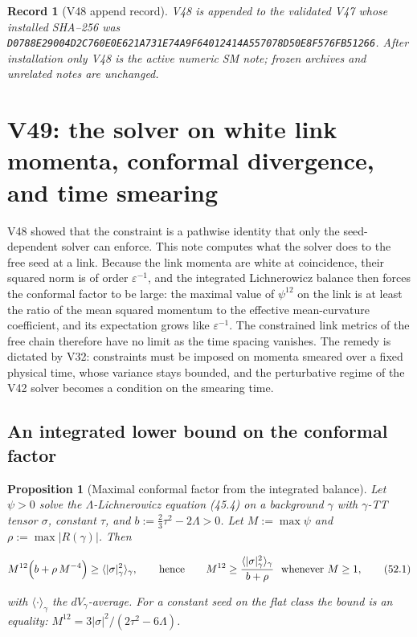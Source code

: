 \documentclass[11pt]{article}
\newtheorem{proposition}[theorem]{Proposition}
\newtheorem{record}[theorem]{Record}
\theoremstyle{remark}
\begin{document}
\begin{record}[V48 append record]
\label{rec:v19v48}
V48 is appended to the validated V47 whose installed SHA--256 was
\texttt{D0788E29004D2C760E0E621A731E74A9F64012414A557078D50E8F576FB51266}.
After installation only V48 is the active numeric SM note; frozen
archives and unrelated notes are unchanged.
\end{record}


\section{V49: the solver on white link momenta, conformal divergence, and time smearing}
\label{sec:v19v49}

V48 showed that the constraint is a pathwise identity that only the
seed-dependent solver can enforce.  This note computes what the solver
does to the free seed at a link.  Because the link momenta are white at
coincidence, their squared norm is of order \(\varepsilon^{-1}\), and the
integrated Lichnerowicz balance then forces the conformal factor to be
large: the maximal value of \(\psi^{12}\) on the link is at least the
ratio of the mean squared momentum to the effective mean-curvature
coefficient, and its expectation grows like \(\varepsilon^{-1}\).  The
constrained link metrics of the free chain therefore have no limit as
the time spacing vanishes.  The remedy is dictated by V32: constraints
must be imposed on momenta smeared over a fixed physical time, whose
variance stays bounded, and the perturbative regime of the V42 solver
becomes a condition on the smearing time.

\subsection{An integrated lower bound on the conformal factor}

\begin{proposition}[Maximal conformal factor from the integrated balance]
\label{prop:v19v49-bound}
Let \(\psi>0\) solve the \(\Lambda\)-Lichnerowicz equation (45.4) on a
background \(\gamma\) with \(\gamma\)-TT tensor \(\sigma\), constant
\(\tau\), and \(b:=\tfrac23\tau^2-2\Lambda>0\).  Let \(M:=\max\psi\) and
\(\rho:=\max|R(\gamma)|\).  Then

\[
 M^{12}\Bigl(b+\rho\,M^{-4}\Bigr)\geq\langle|\sigma|_\gamma^2\rangle_\gamma,
 \qquad\hbox{hence}\qquad
 M^{12}\geq\frac{\langle|\sigma|^2_\gamma\rangle_\gamma}{b+\rho}
 \ \hbox{ whenever }M\geq1,                                            \tag{52.1}
\]

with \(\langle\cdot\rangle_\gamma\) the \(dV_\gamma\)-average.  For a
constant seed on the flat class the bound is an equality:
\(M^{12}=3|\sigma|^2/(2\tau^2-6\Lambda)\).
\end{proposition}
\end{document}
